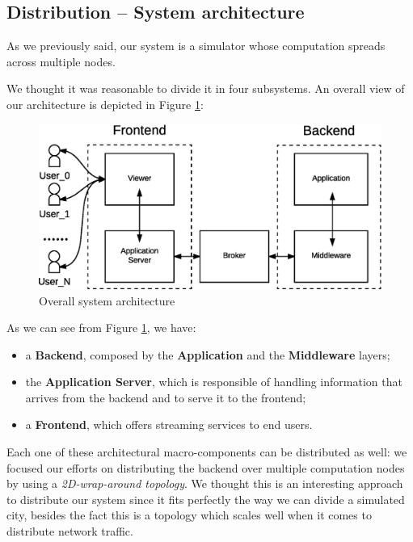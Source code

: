 \subsection{Distribution -- System architecture}
As we previously said, our system is a simulator whose computation spreads
across multiple nodes.

We thought it was reasonable to divide it in four subsystems.
An overall view of our architecture is depicted
in Figure \ref{fig:sd-sys-arch-overall}:

\begin{figure}[H]
  \centering
  \includegraphics[scale=0.5,keepaspectratio]
    {images/solution/overall-arch.eps}
  \caption{Overall system architecture}
  \label{fig:sd-sys-arch-overall}
\end{figure}

As we can see from Figure \ref{fig:sd-sys-arch-overall}, we have:

\begin{itemize}
  \item a \textbf{Backend}, composed by the \textbf{Application} and the
    \textbf{Middleware} layers;
  \item the \textbf{Application Server}, which is responsible of handling
    information that arrives from the backend and to serve it to the frontend;
  \item a \textbf{Frontend}, which offers streaming services to end users.
\end{itemize}

Each one of these architectural macro-components can be distributed as well: we
focused our efforts on distributing the backend over multiple computation nodes
by using a \textit{2D-wrap-around topology}.
We thought this is an interesting approach to distribute our system since it
fits perfectly the way we can divide a simulated city, besides the fact this is
a topology which scales well when it comes to distribute network traffic.

